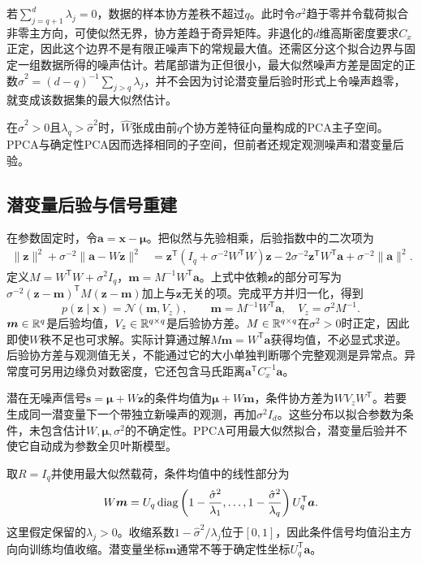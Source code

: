 若$\sum_{j=q+1}^d\lambda_j=0$，数据的样本协方差秩不超过$q$。此时令$\sigma^2$趋于零并令载荷拟合非零主方向，可使似然无界，协方差趋于奇异矩阵。非退化的$d$维高斯密度要求$C_x$正定，因此这个边界不是有限正噪声下的常规最大值。还需区分这个拟合边界与固定一组数据所得的噪声估计。若尾部谱为正但很小，最大似然噪声方差是固定的正数$\hat\sigma^2=(d-q)^{-1}\sum_{j>q}\lambda_j$，并不会因为讨论潜变量后验时形式上令噪声趋零，就变成该数据集的最大似然估计。

在$\hat\sigma^2>0$且$\lambda_q>\hat\sigma^2$时，$\hat W$张成由前$q$个协方差特征向量构成的PCA主子空间。PPCA与确定性PCA因而选择相同的子空间，但前者还规定观测噪声和潜变量后验。

\subsection{潜变量后验与信号重建}
在参数固定时，令$\bm a=\bm x-\bm\mu$。把似然与先验相乘，后验指数中的二次项为
\begin{align}
 \|\bm z\|^2+\sigma^{-2}\|\bm a-W\bm z\|^2
 &=\bm z^{\mathsf T}(I_q+\sigma^{-2}W^{\mathsf T}W)\bm z
 -2\sigma^{-2}\bm z^{\mathsf T}W^{\mathsf T}\bm a
 +\sigma^{-2}\|\bm a\|^2.
\end{align}
定义$M=W^{\mathsf T}W+\sigma^2I_q$，$\bm m=M^{-1}W^{\mathsf T}\bm a$。上式中依赖$\bm z$的部分可写为$\sigma^{-2}(\bm z-\bm m)^{\mathsf T}M(\bm z-\bm m)$加上与$\bm z$无关的项。完成平方并归一化，得到
\begin{equation}
 p(\bm z\mid\bm x)=\mathcal N(\bm m,V_z),\qquad
 \bm m=M^{-1}W^{\mathsf T}\bm a,\quad
 V_z=\sigma^2M^{-1}.
 \label{eq:ppca-posterior}
\end{equation}
$\bm m\in\mathbb{R}^q$是后验均值，$V_z\in\mathbb{R}^{q\times q}$是后验协方差。$M\in\mathbb{R}^{q\times q}$在$\sigma^2>0$时正定，因此即使$W$秩不足也可求解。实际计算通过解$M\bm m=W^{\mathsf T}\bm a$获得均值，不必显式求逆。后验协方差与观测值无关，不能通过它的大小单独判断哪个完整观测是异常点。异常度可另用边缘负对数密度，它还包含马氏距离$\bm a^{\mathsf T}C_x^{-1}\bm a$。

潜在无噪声信号$\bm s=\bm\mu+W\bm z$的条件均值为$\bm\mu+W\bm m$，条件协方差为$WV_zW^{\mathsf T}$。若要生成同一潜变量下一个带独立新噪声的观测，再加$\sigma^2I_d$。这些分布以拟合参数为条件，未包含估计$W,\bm\mu,\sigma^2$的不确定性。PPCA可用最大似然拟合，潜变量后验并不使它自动成为参数全贝叶斯模型。

取$R=I_q$并使用最大似然载荷，条件均值中的线性部分为
\begin{equation}
 W\bm m=U_q\operatorname{diag}\left(1-\frac{\hat\sigma^2}{\lambda_1},\ldots,
 1-\frac{\hat\sigma^2}{\lambda_q}\right)U_q^{\mathsf T}\bm a.
 \label{eq:ppca-shrinkage}
\end{equation}
这里假定保留的$\lambda_j>0$。收缩系数$1-\hat\sigma^2/\lambda_j$位于$[0,1]$，因此条件信号均值沿主方向向训练均值收缩。潜变量坐标$\bm m$通常不等于确定性坐标$U_q^{\mathsf T}\bm a$。

